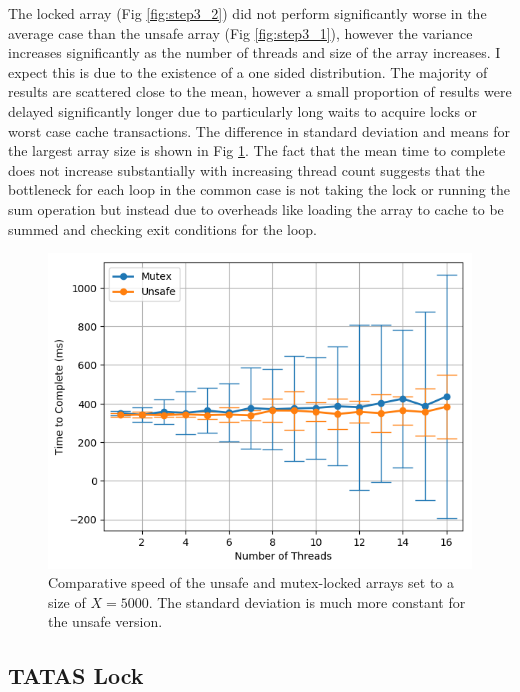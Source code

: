 \documentclass[11pt]{article}
\begin{document}
The locked array (Fig \ref{fig:step3_2}) did not perform significantly worse in the average case than the unsafe array (Fig \ref{fig:step3_1}),
however the variance increases significantly as the number of threads and size of the array increases. I expect this is due to the existence of a one sided distribution. The majority of results are scattered close to the mean, however a small proportion of results were delayed significantly longer due to particularly long waits to acquire locks or worst case cache transactions. The difference in standard deviation and means for the largest array size is shown in Fig \ref{fig:step3_3}. The fact that the mean time to complete does not increase substantially with increasing thread count suggests that the bottleneck for each loop in the common case is not taking the lock or running the sum operation but instead due to overheads like loading the array to cache to be summed and checking exit conditions for the loop.

\begin{figure}
\centering
\includegraphics[scale=0.65]{step3_3.png}
\caption{Comparative speed of the unsafe and mutex-locked arrays set to a size of $X=5000$. The standard deviation is much more constant for the unsafe version.}
\label{fig:step3_3} 
\end{figure}


\subsection{TATAS Lock}
\end{document}
